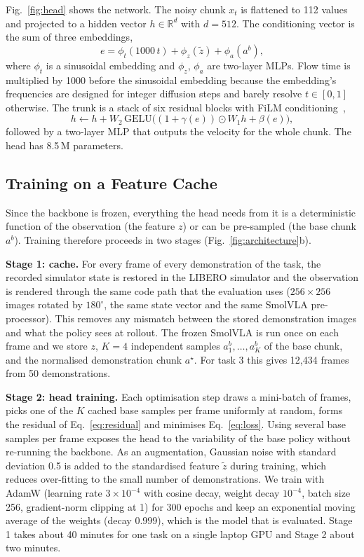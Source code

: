 \documentclass[conference]{IEEEtran}
\begin{document}
Fig.~\ref{fig:head} shows the network. The noisy chunk $x_t$ is flattened to 112 values and projected to a hidden vector $h\in\mathbb{R}^{d}$ with $d=512$. The conditioning vector is the sum of three embeddings,
\begin{equation}
    e=\phi_t(1000\,t)+\phi_z(\tilde z)+\phi_a(a^{b}),
\end{equation}
where $\phi_t$ is a sinusoidal embedding and $\phi_z$, $\phi_a$ are two-layer MLPs. Flow time is multiplied by 1000 before the sinusoidal embedding because the embedding's frequencies are designed for integer diffusion steps and barely resolve $t\in[0,1]$ otherwise. The trunk is a stack of six residual blocks with FiLM conditioning~\cite{film},
\begin{equation}
    h\leftarrow h+W_2\,\mathrm{GELU}\bigl((1+\gamma(e))\odot W_1h+\beta(e)\bigr),
\end{equation}
followed by a two-layer MLP that outputs the velocity for the whole chunk. The head has 8.5\,M parameters.

\subsection{Training on a Feature Cache}
Since the backbone is frozen, everything the head needs from it is a deterministic function of the observation (the feature $z$) or can be pre-sampled (the base chunk $a^{b}$). Training therefore proceeds in two stages (Fig.~\ref{fig:architecture}b).

\textbf{Stage 1: cache.} For every frame of every demonstration of the task, the recorded simulator state is restored in the LIBERO simulator and the observation is rendered through the same code path that the evaluation uses ($256\times256$ images rotated by $180^\circ$, the same state vector and the same SmolVLA pre-processor). This removes any mismatch between the stored demonstration images and what the policy sees at rollout. The frozen SmolVLA is run once on each frame and we store $z$, $K=4$ independent samples $a^{b}_{1},\dots,a^{b}_{K}$ of the base chunk, and the normalised demonstration chunk $a^{\star}$. For task 3 this gives 12{,}434 frames from 50 demonstrations.

\textbf{Stage 2: head training.} Each optimisation step draws a mini-batch of frames, picks one of the $K$ cached base samples per frame uniformly at random, forms the residual of Eq.~\eqref{eq:residual} and minimises Eq.~\eqref{eq:loss}. Using several base samples per frame exposes the head to the variability of the base policy without re-running the backbone. As an augmentation, Gaussian noise with standard deviation 0.5 is added to the standardised feature $\tilde z$ during training, which reduces over-fitting to the small number of demonstrations. We train with AdamW (learning rate $3\times10^{-4}$ with cosine decay, weight decay $10^{-4}$, batch size 256, gradient-norm clipping at 1) for 300 epochs and keep an exponential moving average of the weights (decay 0.999), which is the model that is evaluated. Stage 1 takes about 40 minutes for one task on a single laptop GPU and Stage 2 about two minutes.
\end{document}
